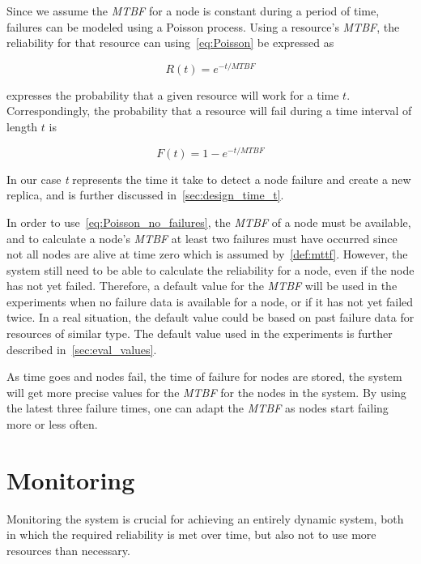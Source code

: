 \documentclass{cslthse-msc}
\begin{document}
Since we assume the \emph{MTBF} for a node is constant during a period of time, failures can be modeled using a Poisson process. Using a resource's \emph{MTBF}, the reliability for that resource can using~\cref{eq:Poisson} be expressed as
 
\begin{equation} \label{eq:resource_reliability}
R(t) = e^{-t/MTBF}
\end{equation}

 expresses the probability that a given resource will work for a time $t$. Correspondingly, the probability that a resource will fail during a time interval of length $t$ is

\begin{equation} \label{eq:resource_failure_prob}
F(t) = 1- e^{-t/MTBF}
\end{equation}

In our case \emph{t} represents the time it take to detect a node failure and create a new replica, and is further discussed in~\cref{sec:design_time_t}.

In order to use~\cref{eq:Poisson_no_failures}, the \emph{MTBF} of a node must be available, and to calculate a node's \emph{MTBF} at least two failures must have occurred since not all nodes are alive at time zero which is assumed by~\cref{def:mttf}. However, the system still need to be able to calculate the reliability for a node, even if the node has not yet failed. Therefore, a default value for the \emph{MTBF} will be used in the experiments when no failure data is available for a node, or if it has not yet failed twice. In a real situation, the default value could be based on past failure data for resources of similar type. The default value used in the experiments is further described in~\cref{sec:eval_values}.

As time goes and nodes fail, the time of failure for nodes are stored, the system will get more precise values for the \emph{MTBF} for the nodes in the system. By using the latest three failure times, one can adapt the \emph{MTBF} as nodes start failing more or less often. 


\section{Monitoring} \label{sec:design_monitoring}
Monitoring the system is crucial for achieving an entirely dynamic system, both in which the required reliability is met over time, but also not to use more resources than necessary. 
\end{document}
